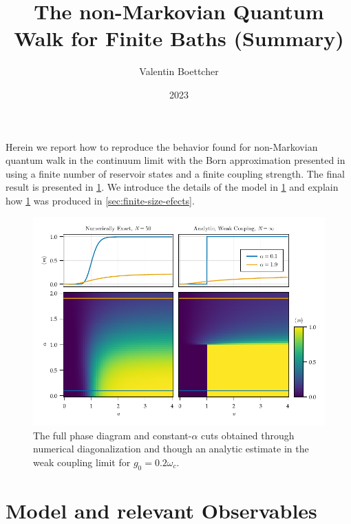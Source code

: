 \documentclass[fontsize=10pt,paper=b5,open=any,
twoside=no,toc=listof,toc=bibliography,headings=optiontohead,
captions=nooneline,captions=tableabove,english,DIV=15,numbers=noenddot,final,parskip=half-,
headinclude=true,footinclude=false,BCOR=0mm]{scrartcl}
\author{Valentin Boettcher}
\title{The non-Markovian Quantum Walk for Finite Baths (Summary)}
\date{2023}
\begin{document}
\maketitle
\tableofcontents
\newpage
Herein we report how to reproduce the behavior found for non-Markovian
quantum walk in the continuum limit with the Born approximation
presented in  using a finite number of
reservoir states and a finite coupling strength. The final result is
presented in \cref{fig:example_finite_vs_continuum}. We introduce the
details of the model in \cref{sec:model-relev-observ} and explain how
\cref{fig:example_finite_vs_continuum} was produced in
\cref{sec:finite-size-efects}.
\begin{figure}[H]
  \centering
  \includegraphics{plots/example_finite_vs_continuum}
  \caption{\label{fig:example_finite_vs_continuum} The full phase
    diagram and constant-\(α\) cuts obtained through numerical
    diagonalization and though an analytic estimate in the weak
    coupling limit for \(g_{0}=0.2 ω_{c}\).}
\end{figure}

\section{Model and relevant Observables}
\label{sec:model-relev-observ}
\end{document}
